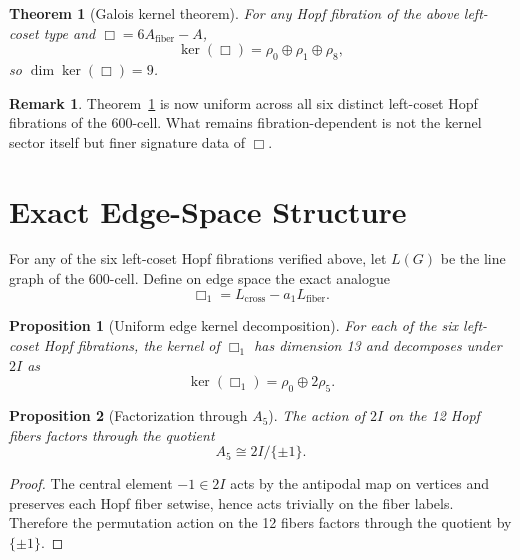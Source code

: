 \documentclass[12pt,a4paper]{article}
\newtheorem{theorem}{Theorem}
\newtheorem{proposition}{Proposition}
\theoremstyle{definition}
\newtheorem{remark}{Remark}
\begin{document}
\begin{theorem}[Galois kernel theorem]
\label{thm:galois_kernel_exact}
For any Hopf fibration of the above left-coset type and $\Box=6A_{\mathrm{fiber}}-A$,
\begin{equation}
\ker(\Box)=\rho_0 \oplus \rho_1 \oplus \rho_8,
\end{equation}
so $\dim\ker(\Box)=9$.
\end{theorem}

\begin{remark}
Theorem~\ref{thm:galois_kernel_exact} is now uniform across all six distinct left-coset Hopf fibrations of the 600-cell.  What remains fibration-dependent is not the kernel sector itself but finer signature data of $\Box$.
\end{remark}

\section{Exact Edge-Space Structure}

For any of the six left-coset Hopf fibrations verified above, let $L(G)$ be
the line graph of the 600-cell.  Define on edge space the exact analogue
\begin{equation}
\Box_1=L_{\mathrm{cross}}-a_1 L_{\mathrm{fiber}}.
\end{equation}

\begin{proposition}[Uniform edge kernel decomposition]
\label{thm:edge_kernel_exact}
For each of the six left-coset Hopf fibrations, the kernel of $\Box_1$ has
dimension 13 and decomposes under $2I$ as
\begin{equation}
\ker(\Box_1)=\rho_0 \oplus 2\rho_5.
\end{equation}
\end{proposition}

\begin{proposition}[Factorization through \texorpdfstring{$A_5$}{A5}]
\label{prop:a5_factor_exact}
The action of $2I$ on the 12 Hopf fibers factors through the quotient
\begin{equation}
A_5 \cong 2I/\{\pm 1\}.
\end{equation}
\end{proposition}

\begin{proof}
The central element $-1\in 2I$ acts by the antipodal map on vertices and preserves each Hopf fiber setwise, hence acts trivially on the fiber labels.  Therefore the permutation action on the 12 fibers factors through the quotient by $\{\pm 1\}$.
\end{proof}
\end{document}
